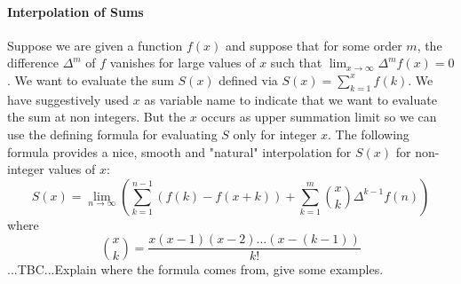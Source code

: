 
\paragraph{Interpolation of Sums}
Suppose we are given a function $f(x)$ and suppose that for some order $m$, the difference $\Delta^m$ of $f$ vanishes for large values of $x$ such that $\lim_{x \rightarrow \infty} \Delta^m f(x) = 0$. We want to evaluate the sum $S(x)$ defined via $S(x) = \sum_{k=1}^{x} f(k)$. We have suggestively used $x$ as variable name to indicate that we want to evaluate the sum at non integers. But the $x$ occurs as upper summation limit so we can use the defining formula for evaluating $S$ only for integer $x$. The following formula provides a nice, smooth and "natural" interpolation for $S(x)$ for non-integer values of $x$:
\begin{equation}
S(x) = \lim_{n \rightarrow \infty} 
\left(   \sum_{k=1}^{n-1} \left(f(k) - f(x+k) \right) 
       + \sum_{k=1}^{m} \binom{x}{k} \Delta^{k-1} f(n)  \right)
\end{equation}
where
\begin{equation}
\binom{x}{k} = \frac{x (x-1) (x-2) \ldots (x-(k-1)) }{k!}
\end{equation}
...TBC...Explain where the formula comes from, give some examples.




